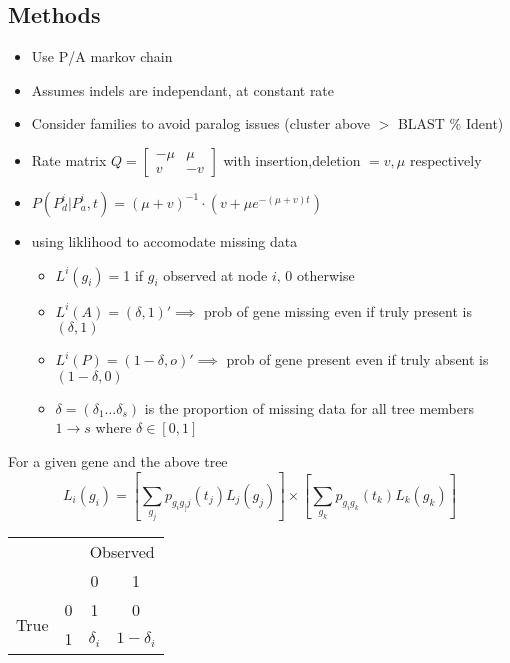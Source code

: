 \documentclass[10pt,letter]{article}
\begin{document}
\subsection*{Methods}
\begin{itemize}
    \item Use P/A markov chain
    \item Assumes indels are independant, at constant rate
    \item Consider families to avoid paralog issues (cluster above $>$ BLAST \% Ident)
    \item Rate matrix $Q = \begin{bmatrix} -\mu & \mu \\ v & -v \end{bmatrix}$ with insertion,deletion $= v, \mu$ respectively
    \item $P(P^i_d|P^i_a,t) = (\mu + v)^{-1} \cdot (v + \mu e^{-(\mu +v)t})$
    \item using liklihood to accomodate missing data
    \begin{itemize}
        \item $L^i(g_i) = $1 if $g_i$ observed at node $i$, $0$ otherwise
        \item $L^i(A) = (\delta,1)' \implies$ prob of gene missing even if truly present is $(\delta,1)$
        \item $L^i(P) = (1-\delta,o)' \implies$ prob of gene present even if truly absent is $(1-\delta,0)$
        \item $\delta = (\delta_1 \dots \delta_s)$ is the proportion of missing data for all tree members $1 \to s$ where $\delta \in [0,1]$
    \end{itemize}
\end{itemize}
\begin{center}
\end{center}
For a given gene and the above tree
$$L_i(g_i) = [\sum_{g_j} p_{g_ig_[j}(t_j)L_j(g_j)] \times [\sum_{g_k} p_{g_ig_k}(t_k)L_k(g_k)]$$
\begin{center}
    \begin{tabular}{c c c c}
                           &                        &\multicolumn{2}{c}{Observed}\\
                           & \multicolumn{1}{c|}{}  & 0          & 1\\\cline{2-4}
     \multirow{2}{*}{True} & \multicolumn{1}{c|}{0} & 1          & 0\\
                           & \multicolumn{1}{c|}{1} & $\delta_i$ & $1 - \delta_i$\\
    \end{tabular}
\end{center}
\end{document}
